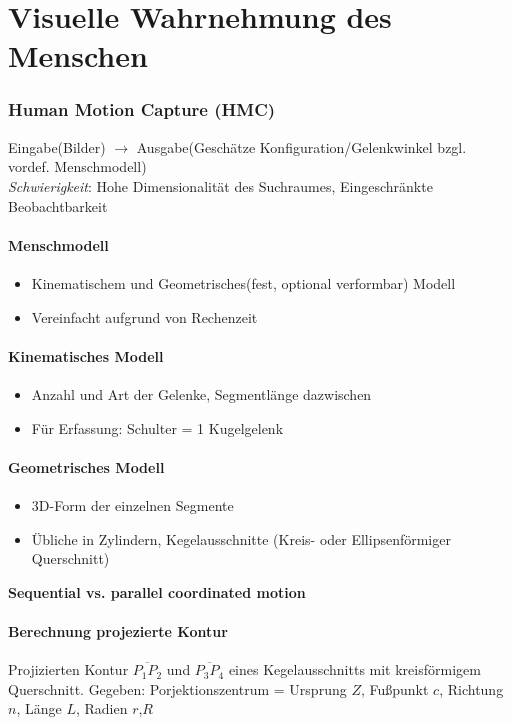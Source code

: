 
\chapter{Visuelle Wahrnehmung des Menschen}

\subsection{Human Motion Capture (HMC)}
Eingabe(Bilder) $\rightarrow$ Ausgabe(Geschätze Konfiguration/Gelenkwinkel bzgl. vordef. Menschmodell) \\
\textit{Schwierigkeit}: Hohe Dimensionalität des Suchraumes, Eingeschränkte Beobachtbarkeit

\subsubsection{Menschmodell}
\begin{itemize}
	\item Kinematischem und Geometrisches(fest, optional verformbar) Modell
	\item Vereinfacht aufgrund von Rechenzeit
\end{itemize}

\subsubsection{Kinematisches Modell}
\begin{itemize}
	\item Anzahl und Art der Gelenke, Segmentlänge dazwischen
	\item Für Erfassung: Schulter = 1 Kugelgelenk
\end{itemize}

\subsubsection{Geometrisches Modell}
\begin{itemize}
	\item 3D-Form der einzelnen Segmente
	\item Übliche in Zylindern, Kegelausschnitte (Kreis- oder Ellipsenförmiger Querschnitt)
\end{itemize}

\textbf{Sequential vs. parallel coordinated motion}

\subsubsection{Berechnung projezierte Kontur}
Projizierten Kontur $\overline{P_1 P_2}$ und $\overline{P_3 P_4}$ eines Kegelausschnitts mit kreisförmigem Querschnitt.
Gegeben: Porjektionszentrum = Ursprung $Z$, Fußpunkt $c$, Richtung $n$, Länge $L$, Radien $r$,$R$

